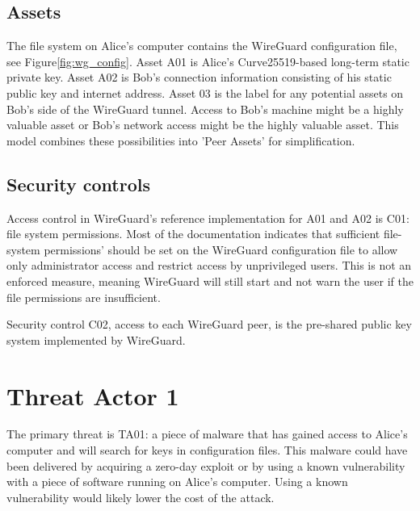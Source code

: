 \documentclass [11pt, proquest] {uwthesis}[2020/02/24]
\begin{document}
\subsection{Assets}
The file system on Alice's computer contains the WireGuard configuration file, see Figure\ref{fig:wg_config}. 
Asset A01 is Alice's Curve25519-based long-term static private key. Asset A02 is Bob's connection information consisting of his static public key and internet address. 
Asset 03 is the label for any potential assets on Bob's side of the WireGuard tunnel. Access to Bob's machine might be a highly valuable asset or Bob's network access might be the highly valuable asset. This model combines these possibilities into 'Peer Assets' for simplification.

\subsection{Security controls}
Access control in WireGuard's reference implementation for A01 and A02 is C01: file system permissions. Most of the documentation indicates that sufficient file-system permissions' should be set on the WireGuard configuration file to allow only administrator access and restrict access by unprivileged users. This is not an enforced measure, meaning WireGuard will still start and not warn the user if the file permissions are insufficient. 

Security control C02, access to each WireGuard peer, is the pre-shared public key system implemented by WireGuard.

\section{Threat Actor 1}
The primary threat is TA01: a piece of malware that has gained access to Alice's computer and will search for keys in configuration files. This malware could have been delivered by acquiring a zero-day exploit or by using a known vulnerability with a piece of software running on Alice's computer. Using a known vulnerability would likely lower the cost of the attack.
\end{document}
